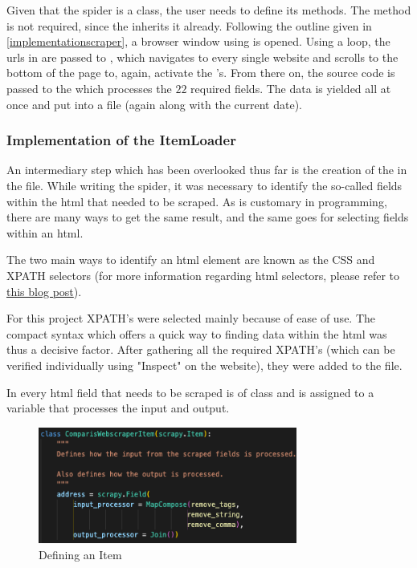 \documentclass[main]{subfiles}
\begin{document}
Given that the spider is a class, the user needs to define its methods. 
The  method is not required, since the  inherits it already.
Following the outline given in \ref{implementationscraper},
a browser window using  \pkg[Selenium] is opened.
Using a \pkg[for] loop, the \acsp*{url} in  are passed to \pkg[Selenium],
which navigates to every single website and scrolls to the bottom of the page to, again, activate the \js's.
From there on, the source code is passed to the \pkg[ItemLoader] which processes the $22$ required fields.
The data is yielded all at once and put into a \pkg[.csv] file (again along with the current date).

\vspace*{5pt}
\subsubsection{Implementation of the ItemLoader}
\label{itemloader}
An intermediary step which has been overlooked thus far is the creation of the \pkg[ItemLoader] in the \pkg[items.py] file.
While writing the  spider, it was necessary to identify the so-called fields within the \acs*{html}
that needed to be scraped.
As is customary in programming, there are many ways to get the same result, 
and the same goes for selecting fields within an \acs*{html}.

The two main ways to identify an \acs*{html} element are known as the CSS and XPATH selectors 
(for more information regarding \acs*{html} selectors, please refer to 
\href{https://medium.com/geekculture/how-to-parse-a-webpage-using-selectors-scraping-with-dfb3894cff58}{this blog post}).

For this project XPATH's were selected mainly because of ease of use.
The compact syntax which offers a quick way to finding data within the \acs*{html} was thus a decisive factor.
After gathering all the required XPATH's (which can be verified individually using "Inspect" on the website), 
they were added to the \pkg[items.py] file.

In \pkg[items.py] every \acs*{html} field that needs to be scraped is of class  
and is assigned to a variable that processes the input and output.


\begin{figure}[htbp]
    \centerline{
        \includegraphics[width = 85mm]{prog_5.png}}
    \caption{Defining an Item}
    \label{fig:itemloader}
\end{figure}
\end{document}
